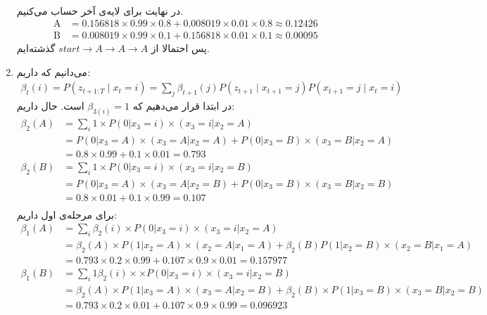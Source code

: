 \begin{enumerate}
\begin{align*}
    \end{align*}
    در نهایت برای لایه‌ی آخر حساب می‌کنیم.
    \begin{align*}
        \text{A} &= 0.156818 \times 0.99 \times 0.8 + 0.008019 \times 0.01 \times 0.8 \approx 0.12426\\
        \text{B} &= 0.008019 \times 0.99 \times 0.1 + 0.156818 \times 0.01 \times 0.1 \approx 0.00095
    \end{align*}
    پس احتمالا از
    $start \rightarrow A \rightarrow A \rightarrow A$
    گذشته‌ایم.
    \item می‌دانیم که داریم:
    \begin{gather*}
        \beta_t(i) = P(z_{t+1:T}\mid x_t=i) = \sum\limits_j \beta_{t+1}(j)P(z_{t+1}\mid x_{t+1}=j)P(x_{t+1}=j\mid x_t=i)
    \end{gather*}
    در ابتدا قرار می‌دهیم که
    $\beta_{3(i)} = 1$
    است. حال داریم:
    \begin{align*}
        \beta_2(A) &= \sum_i 1 \times P(0 | x_3 = i) \times (x_3 = i | x_2 = A)\\
        &= P(0 | x_3 = A) \times (x_3 = A | x_2 = A) + P(0 | x_3 = B) \times (x_3 = B | x_2 = A)\\
        &= 0.8 \times 0.99 + 0.1 \times 0.01 = 0.793\\
        \beta_2(B) &= \sum_i 1 \times P(0 | x_3 = i) \times (x_3 = i | x_2 = B)\\
        &= P(0 | x_3 = A) \times (x_3 = A | x_2 = B) + P(0 | x_3 = B) \times (x_3 = B | x_2 = B)\\
        &= 0.8 \times 0.01 + 0.1 \times 0.99 = 0.107\\
    \end{align*}
    برای مرحله‌ی اول داریم:
    \begin{align*}
        \beta_1(A) &= \sum_i \beta_2(i) \times P(0 | x_3 = i) \times (x_3 = i | x_2 = A)\\
        &= \beta_2(A) \times P(1 | x_2 = A) \times (x_2 = A | x_1 = A) + \beta_2(B) P(1 | x_2 = B) \times (x_2 = B | x_1 = A)\\
        &= 0.793 \times 0.2 \times 0.99 + 0.107 \times 0.9 \times 0.01 = 0.157977\\
        \beta_1(B) &= \sum_i 1 \beta_2(i) \times \times P(0 | x_3 = i) \times (x_3 = i | x_2 = B)\\
        &= \beta_2(A) \times P(1 | x_3 = A) \times (x_3 = A | x_2 = B) + \beta_2(B) \times P(1 | x_3 = B) \times (x_3 = B | x_2 = B)\\
        &= 0.793 \times 0.2 \times 0.01 + 0.107 \times 0.9 \times 0.99 = 0.096923\\

\end{align*}
\end{enumerate}
